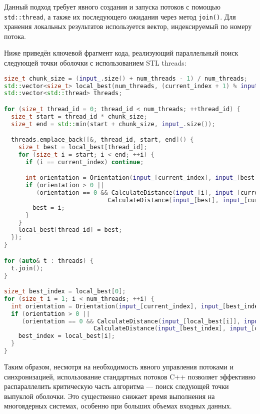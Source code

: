 \documentclass[a4paper,12pt]{article}
\begin{document}
\begin{itemize}
Данный подход требует явного создания и запуска потоков с помощью \texttt{std::thread}, а также их последующего ожидания через метод \texttt{join()}. Для хранения локальных результатов используется вектор, индексируемый по номеру потока.

Ниже приведён ключевой фрагмент кода, реализующий параллельный поиск следующей точки оболочки с использованием STL threads:

\begin{lstlisting}[language=C++, caption={Параллельный выбор следующей точки оболочки с использованием STL threads}]
size_t chunk_size = (input_.size() + num_threads - 1) / num_threads;
std::vector<size_t> local_best(num_threads, (current_index + 1) % input_.size());
std::vector<std::thread> threads;

for (size_t thread_id = 0; thread_id < num_threads; ++thread_id) {
  size_t start = thread_id * chunk_size;
  size_t end = std::min(start + chunk_size, input_.size());

  threads.emplace_back([&, thread_id, start, end]() {
    size_t best = local_best[thread_id];
    for (size_t i = start; i < end; ++i) {
      if (i == current_index) continue;

      int orientation = Orientation(input_[current_index], input_[best], input_[i]);
      if (orientation > 0 || 
         (orientation == 0 && CalculateDistance(input_[i], input_[current_index]) > 
                             CalculateDistance(input_[best], input_[current_index]))) {
        best = i;
      }
    }
    local_best[thread_id] = best;
  });
}

for (auto& t : threads) {
  t.join();
}

size_t best_index = local_best[0];
for (size_t i = 1; i < num_threads; ++i) {
  int orientation = Orientation(input_[current_index], input_[best_index], input_[local_best[i]]);
  if (orientation > 0 || 
     (orientation == 0 && CalculateDistance(input_[local_best[i]], input_[current_index]) > 
                         CalculateDistance(input_[best_index], input_[current_index]))) {
    best_index = local_best[i];
  }
}
\end{lstlisting}

Таким образом, несмотря на необходимость явного управления потоками и синхронизацией, использование стандартных потоков C++ позволяет эффективно распараллелить критическую часть алгоритма — поиск следующей точки выпуклой оболочки. Это существенно снижает время выполнения на многоядерных системах, особенно при больших объемах входных данных.


\end{itemize}
\end{document}
